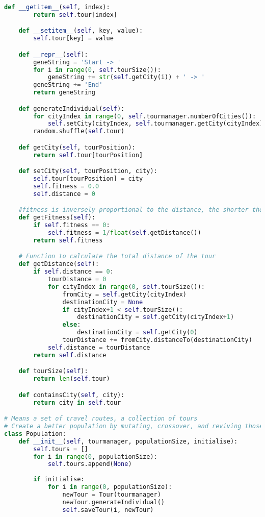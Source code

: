 \documentclass[12pt]{article}
\begin{document}
\begin{lstlisting}[language=Python]
    def __getitem__(self, index):
        return self.tour[index]

    def __setitem__(self, key, value):
        self.tour[key] = value

    def __repr__(self):
        geneString = 'Start -> '
        for i in range(0, self.tourSize()):
            geneString += str(self.getCity(i)) + ' -> '
        geneString += 'End'
        return geneString

    def generateIndividual(self):
        for cityIndex in range(0, self.tourmanager.numberOfCities()):
            self.setCity(cityIndex, self.tourmanager.getCity(cityIndex))
        random.shuffle(self.tour)

    def getCity(self, tourPosition):
        return self.tour[tourPosition]

    def setCity(self, tourPosition, city):
        self.tour[tourPosition] = city
        self.fitness = 0.0
        self.distance = 0

    #fitness is inversely proportional to the distance, the shorter the distance, the higher the score
    def getFitness(self):
        if self.fitness == 0:
            self.fitness = 1/float(self.getDistance())
        return self.fitness

    # Function to calculate the total distance of the tour
    def getDistance(self):
        if self.distance == 0:
            tourDistance = 0
            for cityIndex in range(0, self.tourSize()):
                fromCity = self.getCity(cityIndex)
                destinationCity = None
                if cityIndex+1 < self.tourSize():
                    destinationCity = self.getCity(cityIndex+1)
                else:
                    destinationCity = self.getCity(0)
                tourDistance += fromCity.distanceTo(destinationCity)
            self.distance = tourDistance
        return self.distance

    def tourSize(self):
        return len(self.tour)

    def containsCity(self, city):
        return city in self.tour

# Means a set of travel routes, a collection of tours
# Create a better population by mutating, crossover, and reviving those with high fitness
class Population:
    def __init__(self, tourmanager, populationSize, initialise):
        self.tours = []
        for i in range(0, populationSize):
            self.tours.append(None)
        
        if initialise:
            for i in range(0, populationSize):
                newTour = Tour(tourmanager)
                newTour.generateIndividual()
                self.saveTour(i, newTour)
        

\end{lstlisting}
\end{document}
